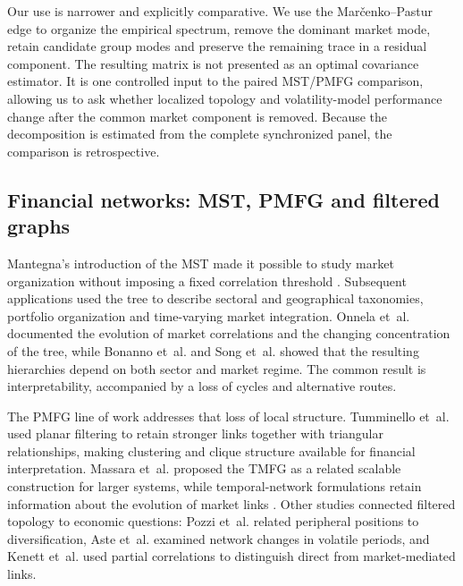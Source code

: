 Our use is narrower and explicitly comparative. We use the Mar\v{c}enko--Pastur edge to organize the empirical spectrum, remove the dominant market mode, retain candidate group modes and preserve the remaining trace in a residual component. The resulting matrix is not presented as an optimal covariance estimator. It is one controlled input to the paired MST/PMFG comparison, allowing us to ask whether localized topology and volatility-model performance change after the common market component is removed. Because the decomposition is estimated from the complete synchronized panel, the comparison is retrospective.

\subsection{Financial networks: MST, PMFG and filtered graphs}

Mantegna's introduction of the MST made it possible to study market organization without imposing a fixed correlation threshold \cite{mantegna_1999_hierarchical}. Subsequent applications used the tree to describe sectoral and geographical taxonomies, portfolio organization and time-varying market integration. Onnela et~al. \cite{onnela_2003_dynamics} documented the evolution of market correlations and the changing concentration of the tree, while Bonanno et~al. \cite{bonanno_2004_networks} and Song et~al. \cite{song_2012_evolution} showed that the resulting hierarchies depend on both sector and market regime. The common result is interpretability, accompanied by a loss of cycles and alternative routes.

The PMFG line of work addresses that loss of local structure. Tumminello et~al. \cite{tumminello_2005_tool,tumminello_2010_correlation} used planar filtering to retain stronger links together with triangular relationships, making clustering and clique structure available for financial interpretation. Massara et~al. \cite{massara_2016_tmfg} proposed the TMFG as a related scalable construction for larger systems, while temporal-network formulations retain information about the evolution of market links \cite{zhao_2018_stock}. Other studies connected filtered topology to economic questions: Pozzi et~al. \cite{pozzi_2013_spread} related peripheral positions to diversification, Aste et~al. \cite{aste_2010_correlation} examined network changes in volatile periods, and Kenett et~al. \cite{kenett_2012_dominating} used partial correlations to distinguish direct from market-mediated links.

